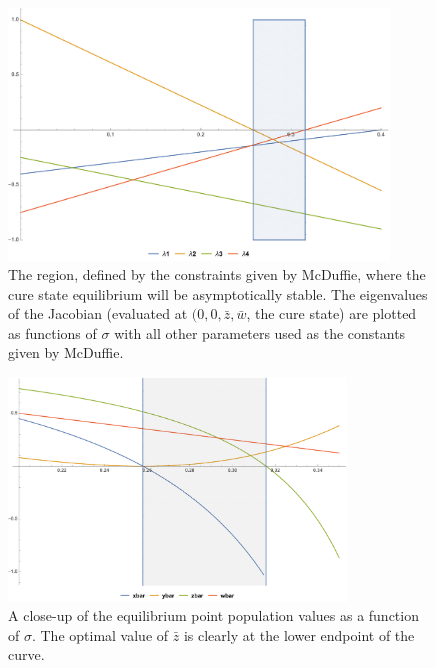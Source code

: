 \documentclass[12pt]{article}
\begin{document}
\begin{figure}[hp]
    \centering
    \includegraphics[width=0.9\textwidth]{EigenvalueStabilityRegion.pdf}
    \caption{The region, defined by the constraints given by McDuffie, where the cure state equilibrium will be asymptotically stable. The eigenvalues of the Jacobian (evaluated at \((0,0,\bar{z},\bar{w}\), the cure state) are plotted as functions of \(\sigma\) with all other parameters used as the constants given by McDuffie.}
    \label{fig:stabilityregion}
\end{figure}

\begin{figure}[hp]
    \centering
    \includegraphics[width=0.8\textwidth]{ZoomedInValues.pdf}
    \caption{A close-up of the equilibrium point population values as a function of \(\sigma\). The optimal value of \(\bar{z}\) is clearly at the lower endpoint of the curve.}
    \label{fig:closeup}
\end{figure}
\end{document}
